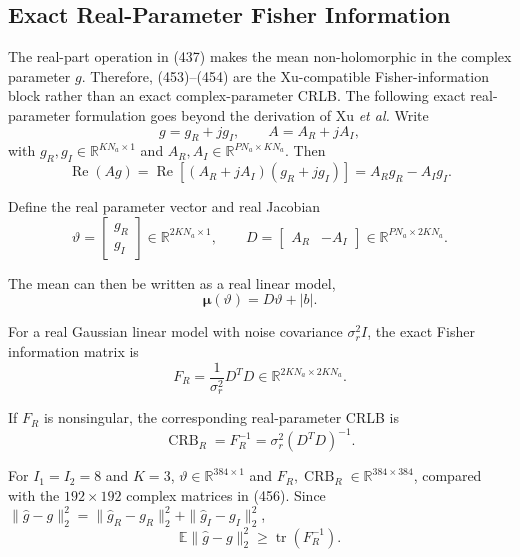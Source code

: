 \documentclass[12pt,a4paper]{article}
\begin{document}
\subsection{Exact Real-Parameter Fisher Information}

The real-part operation in (437) makes the mean non-holomorphic in the
complex parameter $g$. Therefore, (453)--(454) are the Xu-compatible
Fisher-information block rather than an exact complex-parameter CRLB.
The following exact real-parameter formulation goes beyond the
derivation of Xu \emph{et al.} Write
\begin{equation}
\boxed{
 g=g_R+jg_I,
 \qquad
 A=A_R+jA_I,
}
\tag{458}
\end{equation}
with $g_R,g_I\in\mathbb R^{KN_a\times1}$ and
$A_R,A_I\in\mathbb R^{PN_a\times KN_a}$. Then
\begin{equation}
\operatorname{Re}(Ag)
=
\operatorname{Re}\!\left[(A_R+jA_I)(g_R+jg_I)\right]
=
A_Rg_R-A_Ig_I.
\tag{459}
\end{equation}

Define the real parameter vector and real Jacobian
\begin{equation}
\boxed{
\vartheta
=
\begin{bmatrix}
 g_R\\g_I
\end{bmatrix}
\in\mathbb R^{2KN_a\times1},
\qquad
D
=
\begin{bmatrix}
 A_R & -A_I
\end{bmatrix}
\in\mathbb R^{PN_a\times 2KN_a}.
}
\tag{460}
\end{equation}

The mean can then be written as a real linear model,
\begin{equation}
\boxed{
\boldsymbol\mu(\vartheta)
=D\vartheta+|b|.
}
\tag{461}
\end{equation}

For a real Gaussian linear model with noise covariance
$\sigma_r^2I$, the exact Fisher information matrix is
\begin{equation}
\boxed{
F_R
=
\frac{1}{\sigma_r^2}D^TD
\in\mathbb R^{2KN_a\times 2KN_a}.
}
\tag{462}
\end{equation}

If $F_R$ is nonsingular, the corresponding real-parameter CRLB is
\begin{equation}
\boxed{
\operatorname{CRB}_R
=F_R^{-1}
=\sigma_r^2\left(D^TD\right)^{-1}.
}
\tag{463}
\end{equation}

For $I_1=I_2=8$ and $K=3$, $\vartheta\in\mathbb R^{384\times1}$ and
$F_R,\operatorname{CRB}_R\in\mathbb R^{384\times384}$, compared with the
$192\times192$ complex matrices in (456). Since
$\|\hat g-g\|_2^2=\|\hat g_R-g_R\|_2^2+\|\hat g_I-g_I\|_2^2$,
\begin{equation}
\boxed{
\mathbb E\|\hat g-g\|_2^2
\geq
\operatorname{tr}\!\left(F_R^{-1}\right).
}
\tag{463a}
\end{equation}
\end{document}
